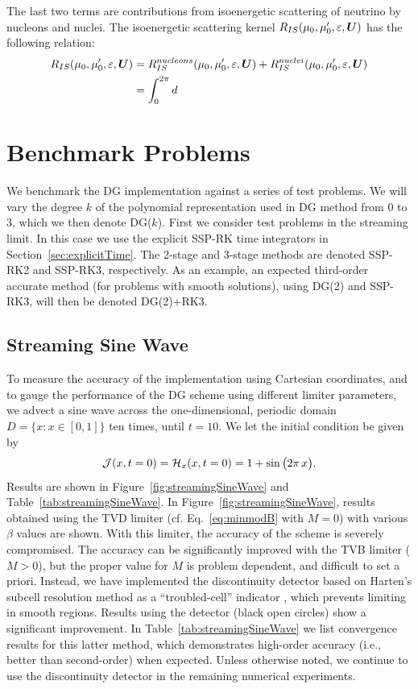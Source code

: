 \documentclass[10pt,preprint]{aastex}
\begin{document}
The last two terms are contributions from isoenergetic scattering of neutrino by nucleons and nuclei. The isoenergetic scattering kernel $R_{IS}(\mu_0, \mu^\prime_0, \varepsilon,\boldsymbol{U})$ has the following relation:
\begin{align}
R_{IS}(\mu_0, \mu^\prime_0, \varepsilon,\boldsymbol{U}) & = R_{IS}^{nucleons}(\mu_0, \mu^\prime_0, \varepsilon,\boldsymbol{U}) +  R_{IS}^{nuclei}(\mu_0, \mu^\prime_0, \varepsilon,\boldsymbol{U})\\
& = \int_{0}^{2\pi}d
\end{align}

\section{Benchmark Problems}

We benchmark the DG implementation against a series of test problems.  
We will vary the degree $k$ of the polynomial representation used in DG method from 0 to 3, which we then denote DG($k$).  
First we consider test problems in the streaming limit.  
In this case we use the explicit SSP-RK time integrators in Section~\ref{sec:explicitTime}.  
The 2-stage and 3-stage methods are denoted SSP-RK2 and SSP-RK3, respectively.  
As an example, an expected third-order accurate method (for problems with smooth solutions), using DG(2) and SSP-RK3, will then be denoted DG(2)+RK3.  

\subsection{Streaming Sine Wave}

To measure the accuracy of the implementation using Cartesian coordinates, and to gauge the performance of the DG scheme using different limiter parameters, we advect a sine wave across the one-dimensional, periodic domain $D=\{x:x\in[0,1]\}$ ten times, until $t=10$.  
We let the initial condition be given by
\begin{equation}
  \mathcal{J}(x,t=0)=\mathcal{H}_{x}(x,t=0)=1+\sin\big(2\pi\,x\big).  
\end{equation}
Results are shown in Figure~\ref{fig:streamingSineWave} and Table~\ref{tab:streamingSineWave}.  
In Figure~\ref{fig:streamingSineWave}, results obtained using the TVD limiter (cf. Eq.~\eqref{eq:minmodB} with $M=0$) with various $\beta$ values are shown.  
With this limiter, the accuracy of the scheme is severely compromised.  
The accuracy can be significantly improved with the TVB limiter ($M>0$), but the proper value for $M$ is problem dependent, and difficult to set a priori.  
Instead, we have implemented the discontinuity detector based on Harten's subcell resolution method as a ``troubled-cell'' indicator \citep{harten_1989,qiuShu_2005}, which prevents limiting in smooth regions.  
Results using the detector (black open circles) show a significant improvement.  
In Table~\ref{tab:streamingSineWave} we list convergence results for this latter method, which demonstrates high-order accuracy (i.e., better than second-order) when expected.  
Unless otherwise noted, we continue to use the discontinuity detector in the remaining numerical experiments.  
\end{document}
